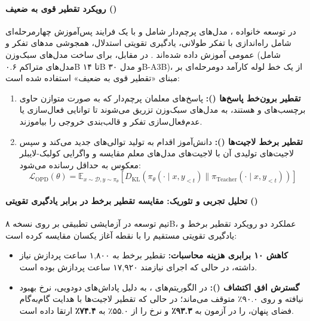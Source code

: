 \item {}

\paragraph*{رویکرد تقطیر قوی به ضعیف ()}
در توسعه خانواده ، مدل‌های پرچم‌دار شامل  و  با یک فرایند پس‌آموزش چهارمرحله‌ای شامل راه‌اندازی با تفکر طولانی، یادگیری تقویتی استدلال، همجوشی مدهای تفکر و  عمومی آموزش داده شده‌اند \cite{qwen2025v3}. در مقابل، برای ساخت مدل‌های سبک‌وزن (شامل مدل‌های متراکم ۰.۶B تا ۱۴B و مدل ۳۰B-A3B)، از یک خط لوله کارآمد دو‌مرحله‌ای بر مبنای «تقطیر قوی به ضعیف» استفاده شده است:
\begin{enumerate}
    \item \textbf{تقطیر برون‌خط پاسخ‌ها ():} پاسخ‌های معلمان پرچم‌دار که به صورت متوازن حاوی برچسب‌های  و  هستند، به مدل‌های سبک‌وزن تزریق می‌شوند تا توانایی فعال‌سازی یا عدم‌فعال‌سازی تفکر و قالب‌بندی خروجی را بیاموزند.
    \item \textbf{تقطیر برخط لاجیت‌ها ():} دانش‌آموز اقدام به تولید توالی‌های جدید می‌کند و سپس لاجیت‌های تولیدی آن با لاجیت‌های مدل‌های معلم مقایسه و واگرایی کولبک-لایبلر معکوس به حداقل رسانده می‌شود:
    \begin{equation}
        \mathcal{L}_{\mathrm{OPD}}(\theta) = \mathbb{E}_{x \sim \mathcal{D}, y \sim \pi_\theta} \left[ D_{\mathrm{KL}}\left(\pi_\theta(\cdot \mid x, y_{<t}) \parallel \pi_{\mathrm{Teacher}}(\cdot \mid x, y_{<t})\right) \right]
    \end{equation}
\end{enumerate}

\paragraph*{تحلیل تجربی و تئوریک: مقایسه تقطیر برخط در برابر یادگیری تقویتی ()}
تیم توسعه  در آزمایشی تطبیقی بر روی نسخه ۸B، عملکرد دو رویکرد تقطیر برخط و یادگیری تقویتی مستقیم را با نقطه آغاز یکسان مقایسه کرده است:
\begin{itemize}
    \item \textbf{کاهش ۱۰ برابری هزینه محاسبات:} تقطیر برخط به ۱,۸۰۰ ساعت پردازش  نیاز داشته، در حالی که اجرای  نیازمند ۱۷,۹۲۰ ساعت پردازش بوده است.
    \item \textbf{گسترش افق اکتشاف ():} در الگوریتم‌های ، به دلیل پاداش‌های دودویی، نرخ  بهبود نیافته و روی ۹۰.۰٪ متوقف می‌ماند؛ در حالی که تقطیر لاجیت‌ها با هدایت گام‌به‌گام فضای پنهان،  را در آزمون  به \textbf{۹۳.۳٪} و نرخ  را از ۵۵.۰٪ به \textbf{۷۴.۴٪} ارتقا داده است.
\end{itemize}

